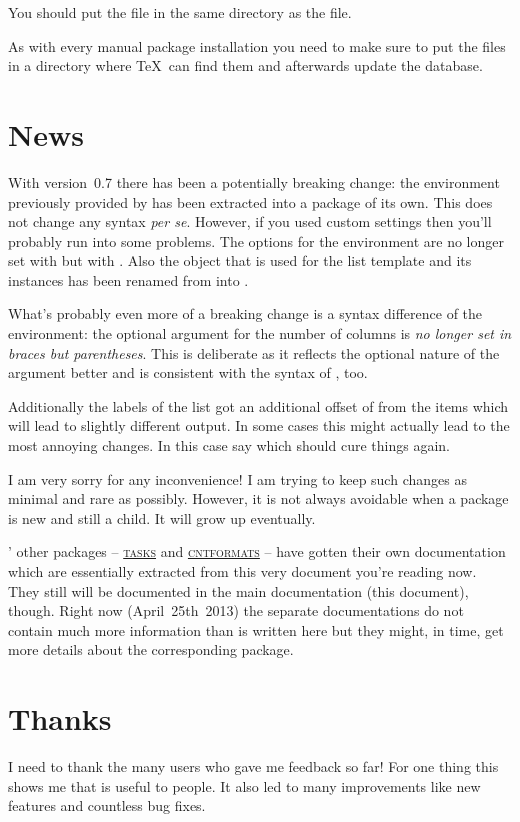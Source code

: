 \documentclass[DIV10,toc=index,toc=bib,numbers=noendperiod]{cnpkgdoc}
\newcommand*\cntformats{{\scshape\textcolor{main}{cntformats}}\xspace}
\newcommand*\Tasks{{\scshape\textcolor{main}{tasks}}\xspace}
\begin{document}
You should put the file  in the same directory as the
 file.

As with every manual package installation you need to make sure to put the
files in a directory where \TeX\ can find them and afterwards update the
database.

\section{News}
With version~0.7 there has been a potentially breaking change: the
 environment previously provided by \ExSheets has been extracted
into a package of its own.  This does not change any syntax \emph{per
  se}. However, if you used custom settings then you'll probably run into some
problems.  The options for the environment are no longer set with
 but with .  Also the object that is used for
the list template and its instances has been renamed from
 into .

What's probably even more of a breaking change is a syntax difference of the
 environment: the optional argument for the number of columns is
\emph{no longer set in braces but parentheses}.  This is deliberate as it
reflects the optional nature of the argument better and is consistent with the
syntax of , too.

Additionally the labels of the list got an additional offset of \code{1ex}
from the items which will lead to slightly different output.  In some cases
this might actually lead to the most annoying changes.  In this case say
 which should cure things again.

I am very sorry for any inconvenience!  I am trying to keep such changes as
minimal and rare as possibly.  However, it is not always avoidable when a
package is new and still a child. It will grow up eventually.

\ExSheets' other packages -- \href{tasks_en.pdf}{\Tasks} and
\href{cntformats_en.pdf}{\cntformats} -- have gotten their own documentation
which are essentially extracted from this very document you're reading now.
They still will be documented in the main documentation (this document),
though.  Right now (April~25th~2013) the separate documentations do not
contain much more information than is written here but they might, in time,
get more details about the corresponding package.

\section{Thanks}
I need to thank the many users who gave me feedback so far!  For one thing
this shows me that \ExSheets is useful to people.  It also led to many
improvements like new features and countless bug fixes.
\end{document}
